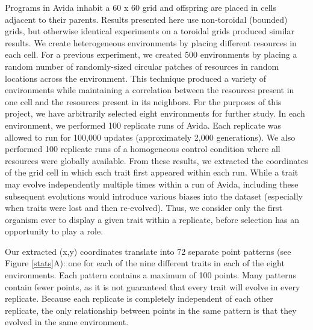 \documentclass[letterpaper]{article}
\begin{document}
Programs in Avida inhabit a 60 x 60 grid and offspring are placed in cells adjacent to their parents. Results presented here use non-toroidal (bounded) grids, but otherwise identical experiments on a toroidal grids produced similar results.  We create heterogeneous environments by placing different resources in each cell. For a previous experiment, %
we created 500 environments by placing a random number of randomly-sized circular patches of resources in random locations across the environment. This technique produced a variety of environments while maintaining a correlation between the resources present in one cell and the resources present in its neighbors. For the purposes of this project, we have arbitrarily selected eight environments for further study. %
In each environment, we performed 100 replicate runs of Avida. Each replicate was allowed to run for 100,000 updates (approximately 2,000 generations). We also performed 100 replicate runs of a homogeneous control condition where all resources were globally available. From these results, we extracted the coordinates of the grid cell in which each trait first appeared within each run. While a trait may evolve independently multiple times within a run of Avida, including these subsequent evolutions would introduce various biases into the dataset (especially when traits were lost and then re-evolved). Thus, we consider only the first organism ever to display a given trait within a replicate, before selection has an opportunity to play a role.

Our extracted (x,y) coordinates translate into 72 separate point patterns (see Figure \ref{stats}A): one for each of the nine different traits in each of the eight environments. Each pattern contains a maximum of 100 points. Many patterns contain fewer points, as it is not guaranteed that every trait will evolve in every replicate. Because each replicate is completely independent of each other replicate, the only relationship between points in the same pattern is that they evolved in the same environment.
\end{document}
